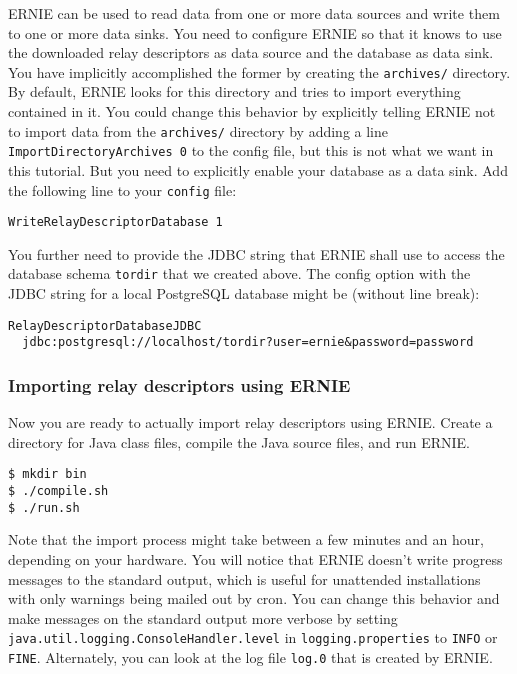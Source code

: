 \documentclass{article}
\begin{document}
ERNIE can be used to read data from one or more data sources and write
them to one or more data sinks.
You need to configure ERNIE so that it knows to use the downloaded relay
descriptors as data source and the database as data sink.
You have implicitly accomplished the former by creating the
\verb+archives/+ directory.
By default, ERNIE looks for this directory and tries to import everything
contained in it.
You could change this behavior by explicitly telling ERNIE not to import
data from the \verb+archives/+ directory by adding a line
\verb+ImportDirectoryArchives 0+ to the config file, but this is not what
we want in this tutorial.
But you need to explicitly enable your database as a data sink.
Add the following line to your \verb+config+ file:

\begin{verbatim}
WriteRelayDescriptorDatabase 1
\end{verbatim}

You further need to provide the JDBC string that ERNIE shall use to access
the database schema \verb+tordir+ that we created above.
The config option with the JDBC string for a local PostgreSQL database
might be (without line break):

\begin{verbatim}
RelayDescriptorDatabaseJDBC
  jdbc:postgresql://localhost/tordir?user=ernie&password=password
\end{verbatim}

\subsubsection{Importing relay descriptors using ERNIE}

Now you are ready to actually import relay descriptors using ERNIE.
Create a directory for Java class files, compile the Java source files,
and run ERNIE.

\begin{verbatim}
$ mkdir bin
$ ./compile.sh
$ ./run.sh
\end{verbatim}

Note that the import process might take between a few minutes and an hour,
depending on your hardware.
You will notice that ERNIE doesn't write progress messages to the standard
output, which is useful for unattended installations with only warnings
being mailed out by cron.
You can change this behavior and make messages on the standard output more
verbose by setting
\verb+java.util.logging.ConsoleHandler.level+ in
\verb+logging.properties+ to \verb+INFO+ or \verb+FINE+.
Alternately, you can look at the log file \verb+log.0+ that is created by
ERNIE.
\end{document}

